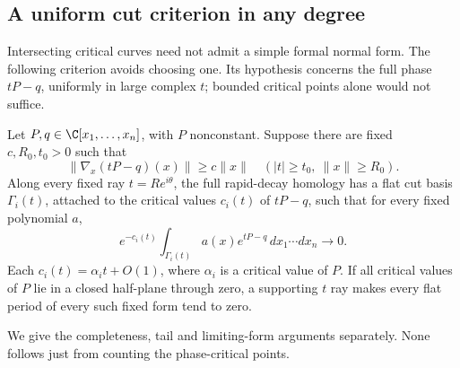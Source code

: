 \subsection{A uniform cut criterion in any degree}
\label{sec:uniformcutdecay}

Intersecting critical curves need not admit a simple formal normal
form. The following criterion avoids choosing one. Its hypothesis
concerns the full phase $tP-q$, uniformly in large complex $t$;
bounded critical points alone would not suffice.

\begin{theorem}\label{thm:uniformcuts}
Let $P,q\in\C[x_1,\ldots,x_n]$, with $P$ nonconstant. Suppose
there are fixed $c,R_0,t_0>0$ such that
\begin{equation}\label{eq:uniformphasegradient}
 \|\nabla_x(tP-q)(x)\|\ge c\|x\|
       \quad(|t|\ge t_0,\ \|x\|\ge R_0).
\end{equation}
Along every fixed ray $t=Re^{i\theta}$, the full rapid-decay
homology has a flat cut basis $\Gamma_i(t)$, attached to the
critical values $c_i(t)$ of $tP-q$, such that for every fixed
polynomial $a$,
\begin{equation}\label{eq:normalizedcutdecay}
 e^{-c_i(t)}\int_{\Gamma_i(t)}a(x)e^{tP-q}\,
                 dx_1\cdots dx_n\longrightarrow0.
\end{equation}
Each $c_i(t)=\alpha_i t+O(1)$, where $\alpha_i$ is a critical
value of $P$. If all critical values of $P$ lie in a closed
half-plane through zero, a supporting $t$ ray makes every flat
period of every such fixed form tend to zero.
\end{theorem}

We give the completeness, tail and limiting-form arguments separately.
None follows just from counting the phase-critical points.

